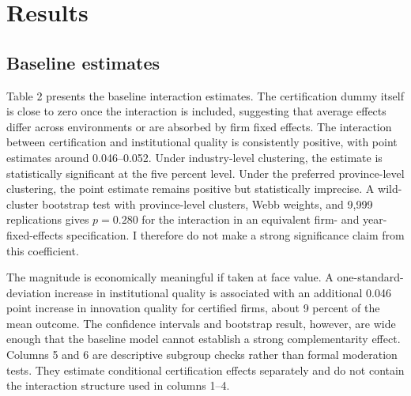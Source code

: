 \documentclass[12pt]{article}
\begin{document}
\section{Results}

\subsection{Baseline estimates}

Table 2 presents the baseline interaction estimates. The certification dummy itself is close to zero once the interaction is included, suggesting that average effects differ across environments or are absorbed by firm fixed effects. The interaction between certification and institutional quality is consistently positive, with point estimates around 0.046--0.052. Under industry-level clustering, the estimate is statistically significant at the five percent level. Under the preferred province-level clustering, the point estimate remains positive but statistically imprecise. A wild-cluster bootstrap test with province-level clusters, Webb weights, and 9,999 replications gives \(p=0.280\) for the interaction in an equivalent firm- and year-fixed-effects specification. I therefore do not make a strong significance claim from this coefficient.

The magnitude is economically meaningful if taken at face value. A one-standard-deviation increase in institutional quality is associated with an additional 0.046 point increase in innovation quality for certified firms, about 9 percent of the mean outcome. The confidence intervals and bootstrap result, however, are wide enough that the baseline model cannot establish a strong complementarity effect. Columns 5 and 6 are descriptive subgroup checks rather than formal moderation tests. They estimate conditional certification effects separately and do not contain the interaction structure used in columns 1--4.
\end{document}
